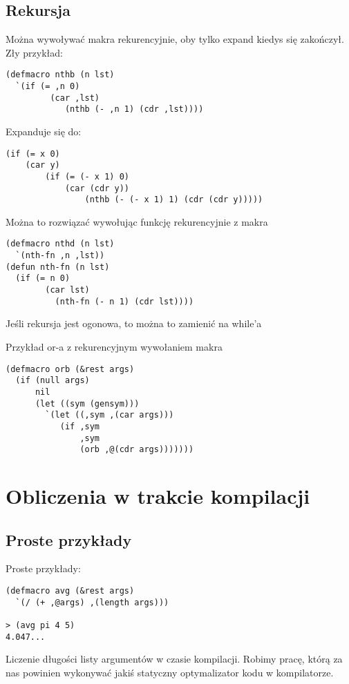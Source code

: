 \subsection{Rekursja} %
\label{sub:Rekursja}
\begin{frame}[fragile]{}
Można wywoływać makra rekurencyjnie, oby tylko expand kiedys się zakończył. Zły przykład:
\begin{verbatim}
(defmacro nthb (n lst)
  `(if (= ,n 0)
         (car ,lst)
	        (nthb (- ,n 1) (cdr ,lst))))
\end{verbatim}
\pause
Expanduje się do:
\pause
\begin{verbatim}
(if (= x 0)
    (car y)
        (if (= (- x 1) 0)
	        (car (cdr y))
		        (nthb (- (- x 1) 1) (cdr (cdr y)))))
\end{verbatim}
\end{frame}


\begin{frame}[fragile]{}
Można to rozwiązać wywołując funkcję rekurencyjnie z makra
\begin{verbatim}
(defmacro nthd (n lst)
  `(nth-fn ,n ,lst))
(defun nth-fn (n lst)
  (if (= n 0)
        (car lst)
	      (nth-fn (- n 1) (cdr lst))))
\end{verbatim}
\pause
Jeśli rekursja jest ogonowa, to można to zamienić na while'a 
\end{frame}

\begin{frame}[fragile]{}
Przykład or-a z rekurencyjnym wywołaniem makra
\begin{verbatim}
(defmacro orb (&rest args)
  (if (null args)
      nil
      (let ((sym (gensym)))
        `(let ((,sym ,(car args)))
           (if ,sym
               ,sym
               (orb ,@(cdr args)))))))
\end{verbatim}
\end{frame}

\section{Obliczenia w trakcie kompilacji}
\begin{frame}{}
\end{frame}
\subsection{Proste przykłady}
\begin{frame}[fragile]{}
Proste przykłady:
\begin{verbatim}
(defmacro avg (&rest args)
  `(/ (+ ,@args) ,(length args)))

> (avg pi 4 5)
4.047...
\end{verbatim}
\pause
Liczenie długości listy argumentów w czasie kompilacji.
\pause
Robimy pracę, którą za nas powinien wykonywać jakiś statyczny optymalizator kodu w kompilatorze.
\end{frame}

